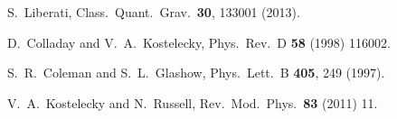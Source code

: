 \documentclass{webofc}
\begin{document}
\begin{thebibliography}{99}


  S.~Liberati,
  Class.\ Quant.\ Grav.\  {\bf 30}, 133001 (2013).

  D.~Colladay and V.~A.~Kostelecky,
  Phys.\ Rev.\ D {\bf 58} (1998) 116002.




  S.~R.~Coleman and S.~L.~Glashow,
  Phys.\ Lett.\ B {\bf 405}, 249 (1997).

  V.~A.~Kostelecky and N.~Russell,
  Rev.\ Mod.\ Phys.\  {\bf 83} (2011) 11.






\end{thebibliography}
\end{document}

